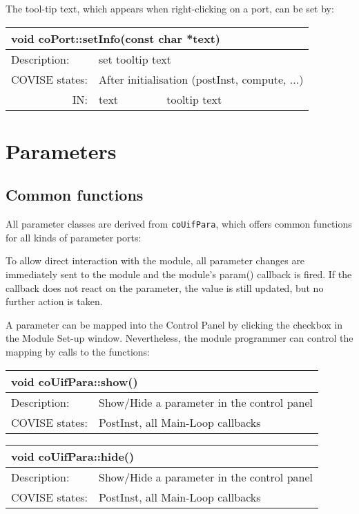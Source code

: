 The tool-tip text, which appears when right-clicking on a port, can be set by:

\begin{longtable}{|p{4cm}|p{2.5cm}|p{7cm}|}
\hline
\multicolumn{3}{|p{13.5cm}|}{\bf void coPort::setInfo(const char *text)} \\
\hline
{Description:}   & 
                        \multicolumn{2}{|p{9.5cm}|}{set tooltip text} \\
\hline
{COVISE states:} 
            & \multicolumn{2}{|p{9.5cm}|}{After initialisation (postInst, compute, ...)} \\
\hline
\multicolumn{1}{|r|}{IN:}  & {text} & 
                        {tooltip text} \endhead
\hline
\end{longtable}


\section{Parameters}

\subsection{Common functions}

All parameter classes are derived from {\tt coUifPara}, which offers common functions 
for all kinds of parameter ports:

To allow direct interaction with the module, 
all parameter changes are immediately sent to the module and 
the module's param() callback is fired. If the callback does not react on the parameter,
the value is still updated, but no further action is taken.

A parameter can be mapped into the Control Panel by clicking the checkbox in the Module 
Set-up window. Nevertheless, the module programmer can control the mapping by calls to 
the functions:


\begin{longtable}{|p{4cm}|p{10cm}|}
\hline
\multicolumn{2}{|p{13.5cm}|}{\bf void coUifPara::show()} \\
\hline
{Description:}   & 
           {Show/Hide a parameter in the control panel} \\
\hline
{COVISE states:} 
            & {PostInst, all Main-Loop callbacks} \endhead
\hline	   
\end{longtable}

\begin{longtable}{|p{4cm}|p{10cm}|}
\hline
\multicolumn{2}{|p{13.5cm}|}{\bf void coUifPara::hide()} \\
\hline
{Description:}   & 
           {Show/Hide a parameter in the control panel} \\
\hline
{COVISE states:} 
            & {PostInst, all Main-Loop callbacks} \endhead
\hline	   
\end{longtable}

